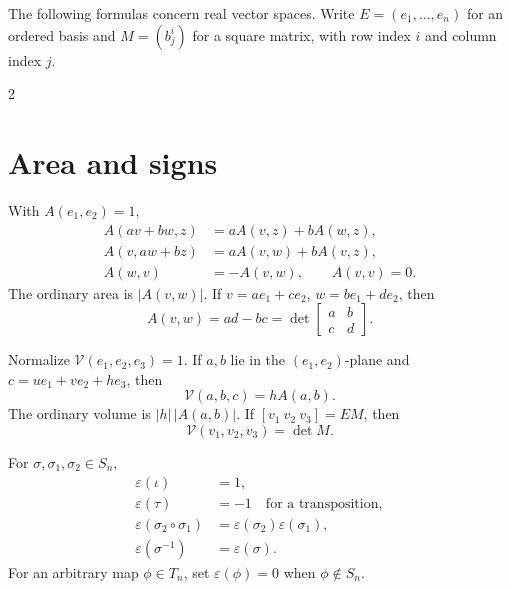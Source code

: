 \clearpage
\begin{fullwidth}
  The following formulas concern real vector spaces. Write \(E=(e_1,\ldots,e_n)\)
  for an ordered basis and \(M=(b^i_j)\) for a square matrix, with row index
  \(i\) and column index \(j\).

  \begin{multicols}{2}
    \raggedcolumns
    \section{Area and signs}
    \label{sec:appendix:formula-sheet-area-and-signs}

    With \(A(e_1,e_2)=1\),
    \[
      \begin{aligned}
        A(av+bw,z)&=aA(v,z)+bA(w,z),\\
        A(v,aw+bz)&=aA(v,w)+bA(v,z),\\
        A(w,v)&=-A(v,w),\qquad A(v,v)=0.
      \end{aligned}
    \]
    The ordinary area is \(|A(v,w)|\). If
    \(v=ae_1+ce_2\), \(w=be_1+de_2\), then
    \[
      A(v,w)=ad-bc=\det\begin{bmatrix}a&b\\c&d\end{bmatrix}.
    \]

    Normalize \(\mathcal V(e_1,e_2,e_3)=1\). If \(a,b\) lie in the
    \((e_1,e_2)\)-plane and \(c=ue_1+ve_2+he_3\), then
    \[
      \mathcal V(a,b,c)=hA(a,b).
    \]
    The ordinary volume is \(|h|\,|A(a,b)|\). If
    \([v_1\ v_2\ v_3]=EM\), then
    \[
      \mathcal V(v_1,v_2,v_3)=\det M.
    \]

    For \(\sigma,\sigma_1,\sigma_2\in S_n\),
    \[
      \begin{aligned}
        \varepsilon(\iota)&=1,\\
        \varepsilon(\tau)&=-1\quad\text{for a transposition},\\
        \varepsilon(\sigma_2\circ\sigma_1)
          &=\varepsilon(\sigma_2)\varepsilon(\sigma_1),\\
        \varepsilon(\sigma^{-1})&=\varepsilon(\sigma).
      \end{aligned}
    \]
    For an arbitrary map \(\phi\in T_n\), set
    \(\varepsilon(\phi)=0\) when \(\phi\notin S_n\).


\end{multicols}
\end{fullwidth}
